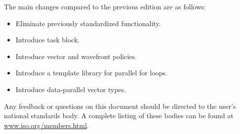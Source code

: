 \pnum
The main changes compared to the previous edition are as follows:

\begin{itemize}
  \item Eliminate previously standardized functionality.
  \item Introduce task block.
  \item Introduce vector and wavefront policies.
  \item Introduce a template library for parallel for loops.
  \item Introduce data-parallel vector types.
\end{itemize}

Any feedback or questions on this document should be directed to the user's national standards body. A complete listing of these bodies can be found at \url{www.iso.org/members.html}.

